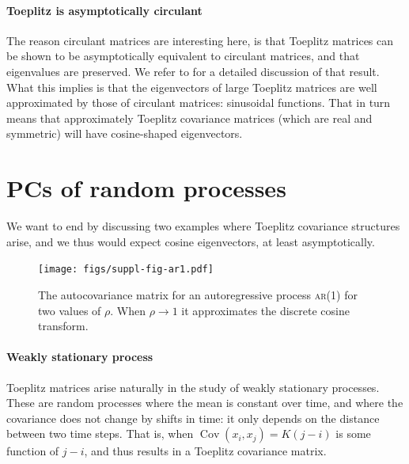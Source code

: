\documentclass[a4paper, fontsize=9pt, twocolumn]{scrreprt}
\DeclareMathOperator{\Cov}{Cov}
\begin{document}
\paragraph{Toeplitz is asymptotically circulant}

The reason circulant matrices are interesting here, is that
Toeplitz matrices can be shown to be asymptotically equivalent to circulant matrices, and that eigenvalues are preserved.
We refer to \textcite{Gray2006} for a detailed discussion of that result.
What this implies is that the eigenvectors of large Toeplitz matrices are well approximated by those of circulant matrices: sinusoidal functions.
That in turn means that approximately Toeplitz covariance matrices (which are real and symmetric) will have cosine-shaped eigenvectors. 


\section{PCs of random processes}


We want to end by discussing two examples where Toeplitz covariance structures arise, and we thus would expect cosine eigenvectors, at least asymptotically.


\begin{figure}
    \centering
    \texttt{[image: figs/suppl-fig-ar1.pdf]}
    \caption{The autocovariance matrix for an autoregressive process \textsc{ar}(1) for two values of $\rho$. When $\rho\to 1$ it approximates the discrete cosine transform.}
    \label{fig:ar1}
\end{figure}


\paragraph{Weakly stationary process}

Toeplitz matrices arise naturally in the study of weakly stationary processes.
These are random processes where the mean is constant over time, and where the covariance does not change by shifts in time: it only depends on the distance between two time steps.
That is, when $\Cov(x_i, x_j) = K(j-i)$ is some function of $j-i$, and thus results in a Toeplitz covariance matrix.
\end{document}
